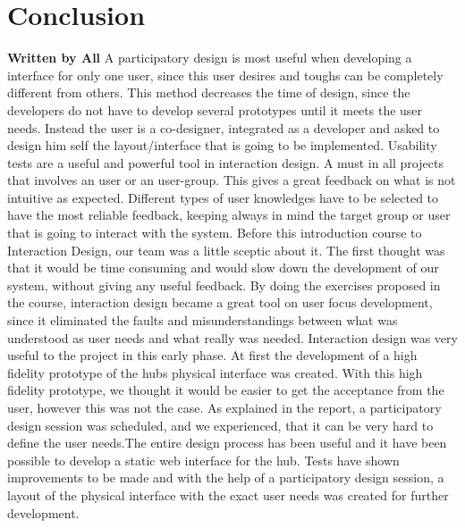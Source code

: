 \chapter{Conclusion}
\textbf{Written by All}
\p A participatory design is most useful when developing a interface for only one user, since this user desires and toughs can be completely different from others. This method decreases the time of design, since the developers do not have to develop several prototypes until it meets the user needs. Instead the user is a co-designer, integrated as a developer and asked to design him self the layout/interface that is going to be implemented. 
\p Usability tests are a useful and powerful tool in interaction design. A must in all projects that involves an user or an user-group. This gives a great feedback on what is not intuitive as expected. Different types of user knowledges have to be selected to have the most reliable feedback, keeping always in mind the target group or user that is going to interact with the system.
\p Before this introduction course to Interaction Design, our team was a little sceptic about it. The first thought was that it would be time consuming and would slow down the development of our system, without giving any useful feedback.
\p By doing the exercises proposed in the course, interaction design became a great tool on user focus development, since it eliminated the faults and misunderstandings between what was understood as user needs and what really was needed.
\p Interaction design was very useful to the project in this early phase. At first the development of a high fidelity prototype of the hubs physical interface was created. With this high fidelity prototype, we thought it would be easier to get the acceptance from the user, however this was not the case. As explained in the report, a participatory design session was scheduled, and we experienced, that it can be very hard to define the user needs.\p The entire design process has been useful and it have been possible to develop a static web interface for the hub. Tests have shown improvements to be made and with the help of a participatory design session, a layout of the physical interface with the exact user needs was created for further development. 